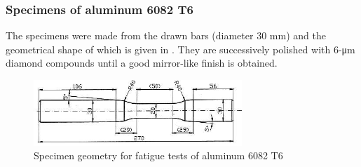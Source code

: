 \subsubsection{Specimens of aluminum 6082 T6}
The specimens were made from the drawn bars (diameter 30 mm) and the geometrical shape of which is given in . They are successively polished with 6-μm diamond compounds until a good mirror-like finish is obtained.
\begin{figure}[!h]
\centering
\includegraphics[width=0.7\textwidth]{figures//aluminum6082T6sample.png} 
\caption{Specimen geometry for fatigue tests of aluminum 6082 T6}
\label{fig:aluminum6082T6}
\end{figure}

